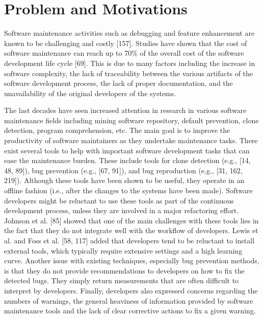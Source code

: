 \documentclass[12pt]{report}
\begin{document}
\section{Problem and Motivations}\label{problem-and-motivations}

Software maintenance activities such as debugging and feature
enhancement are known to be challenging and costly {[}157{]}. Studies
have shown that the cost of software maintenance can reach up to 70\% of
the overall cost of the software development life cycle {[}69{]}. This
is due to many factors including the increase in software complexity,
the lack of traceability between the various artifacts of the software
development process, the lack of proper documentation, and the
unavailability of the original developers of the systems.

The last decades have seen increased attention in research in various
software maintenance fields including mining software repository,
default prevention, clone detection, program comprehension, etc. The
main goal is to improve the productivity of software maintainers as they
undertake maintenance tasks. There exist several tools to help with
important software development tasks that can ease the maintenance
burden. These include tools for clone detection (e.g., {[}14, 48,
89{]}), bug prevention (e.g., {[}67, 91{]}), and bug reproduction (e.g.,
{[}31, 162, 219{]}). Although these tools have been shown to be useful,
they operate in an offline fashion (i.e., after the changes to the
systems have been made). Software developers might be reluctant to use
these tools as part of the continuous development process, unless they
are involved in a major refactoring effort. Johnson et al. {[}85{]}
showed that one of the main challenges with these tools lies in the fact
that they do not integrate well with the workflow of developers. Lewis
et al. and Foss et al. {[}58, 117{]} added that developers tend to be
reluctant to install external tools, which typically require extensive
settings and a high learning curve. Another issue with existing
techniques, especially bug prevention methods, is that they do not
provide recommendations to developers on how to fix the detected bugs.
They simply return measurements that are often difficult to interpret by
developers. Finally, developers also expressed concerns regarding the
numbers of warnings, the general heaviness of information provided by
software maintenance tools and the lack of clear corrective actions to
fix a given warning.
\end{document}
